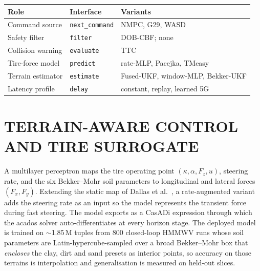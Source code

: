 \documentclass{acmd2026_fullpaper}
\begin{document}
\begin{table}[t]
  \begin{center}
    \vspace{1mm}
    \small
    \begin{tabular}{lll}
      \toprule
      \textbf{Role} & \textbf{Interface} & \textbf{Variants}\\
      \midrule
      Command source    & \texttt{next\_command} & NMPC, G29, WASD\\
      Safety filter     & \texttt{filter}        & DOB-CBF; none\\
      Collision warning & \texttt{evaluate}      & TTC\\
      Tire-force model  & \texttt{predict}       & rate-MLP, Pacejka, TMeasy\\
      Terrain estimator & \texttt{estimate}      & Fused-UKF, window-MLP, Bekker-UKF\\
      Latency profile   & \texttt{delay}         & constant, replay, learned 5G\\
      \bottomrule
    \end{tabular}
    \label{tab:swap}
  \end{center}
\end{table}

\section{TERRAIN-AWARE CONTROL AND TIRE SURROGATE}
A multilayer perceptron maps the tire operating point
$(\kappa,\alpha,F_z,u)$, steering rate, and the six Bekker--Mohr soil parameters
to longitudinal and lateral forces $(F_x,F_y)$. Extending the static map of
Dallas et al.~\cite{Dallas21}, a rate-augmented variant adds the steering rate
as an input so the model represents the transient force during fast steering.
The model exports as a CasADi expression through which the acados solver
auto-differentiates at every horizon stage. The deployed model is trained on
$\sim$1.85\,M tuples from 800 closed-loop HMMWV runs whose soil parameters are
Latin-hypercube-sampled over a broad Bekker--Mohr box that \emph{encloses} the
clay, dirt and sand presets as interior points, so accuracy on those terrains is
interpolation and generalisation is measured on held-out slices.
\end{document}
